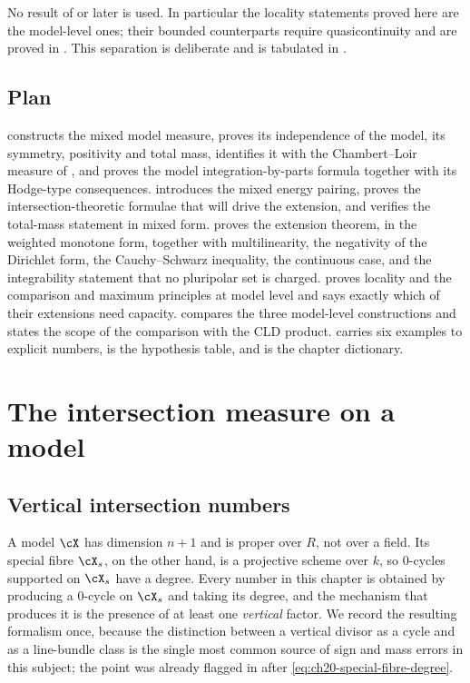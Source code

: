 No result of  or later is used.  In particular the
locality statements proved here are the model-level ones; their bounded
counterparts require quasicontinuity and are proved in
.  This separation is deliberate and is tabulated in
.

\subsection{Plan}
\label{sec:ch24-plan}

 constructs the mixed model measure, proves its
independence of the model, its symmetry, positivity and total mass,
identifies it with the Chambert--Loir measure of
, and proves the model integration-by-parts
formula together with its Hodge-type consequences.
 introduces the mixed energy pairing, proves the
intersection-theoretic formulae that will drive the extension, and verifies
the total-mass statement in mixed form.
 proves the extension theorem, in the weighted
monotone form, together with multilinearity, the negativity of the Dirichlet
form, the Cauchy--Schwarz inequality, the continuous case, and the
integrability statement that no pluripolar set is charged.
 proves locality and the comparison and maximum
principles at model level and says exactly which of their extensions need
capacity.   compares the three model-level
constructions and states the scope of the comparison with the CLD product.
 carries six examples to explicit numbers,
 is the hypothesis table, and
 is the chapter dictionary.

\section{The intersection measure on a model}
\label{sec:ch24-model-measure}

\subsection{Vertical intersection numbers}
\label{sec:ch24-vertical-numbers}

A model $\cX$ has dimension $n+1$ and is proper over $R$, not over a
field.  Its special fibre $\cX_s$, on the other hand, is a projective
scheme over $k$, so $0$-cycles supported on $\cX_s$ have a degree.
Every number in this chapter is obtained by producing a $0$-cycle on
$\cX_s$ and taking its degree, and the mechanism that produces it is the
presence of at least one \emph{vertical} factor.  We record the resulting
formalism once, because the distinction between a vertical divisor as a
cycle and as a line-bundle class is the single most common source of sign
and mass errors in this subject; the point was already flagged in
 after \eqref{eq:ch20-special-fibre-degree}.

